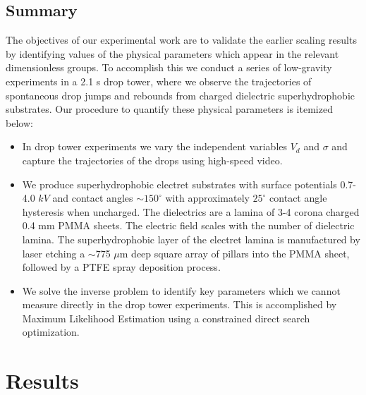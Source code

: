 \documentclass[12pt,a4paper,oneside]{book}
\begin{document}
\section{Summary}
The objectives of our experimental work are to validate the earlier scaling results by identifying values of the physical parameters which appear in the relevant dimensionless groups. To accomplish this we conduct a series of low-gravity experiments in a 2.1 s drop tower, where we observe the trajectories of spontaneous drop jumps and rebounds from charged dielectric superhydrophobic substrates. Our procedure to quantify these physical parameters is itemized below: 
\begin{itemize}
\item  In drop tower experiments we vary the independent variables $V_d$ and $\sigma$ and capture the trajectories of the drops using high-speed video. 
\item We produce superhydrophobic electret substrates with surface potentials 0.7-4.0 $kV$ and contact angles $\sim 150^{\circ}$ with approximately $25^{\circ}$ contact angle hysteresis when uncharged. The dielectrics are a lamina of 3-4 corona charged 0.4 mm PMMA sheets. The electric field scales with the number of dielectric lamina. The superhydrophobic layer of the electret lamina is manufactured by laser etching a $\sim$775 $\mu$m deep square array of pillars into the PMMA sheet, followed by a PTFE spray deposition process. 
\item We solve the inverse problem to identify key parameters which we cannot measure directly in the drop tower experiments. This is accomplished by Maximum Likelihood Estimation using a constrained direct search optimization.
\end{itemize}

\chapter{Results}
\end{document}
